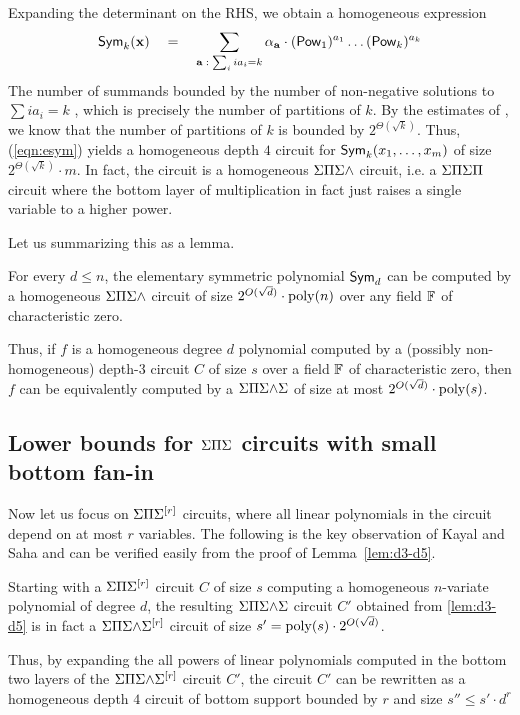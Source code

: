 Expanding the determinant on the RHS, we obtain a homogeneous
expression
\begin{equation}\label{eqn:esym}
\mathsf{Sym}_k(\mathbf{x}) \quad = \quad \sum_{\mathbf{a}\;:\; \sum_i ia_i = k} \alpha_{\mathbf{a}} \cdot (\mathsf{Pow}_1)^{a_1}\dots (\mathsf{Pow}_k)^{a_k}
\end{equation}
The number of summands bounded by the number of non-negative solutions
to $\sum i a_i = k$ , which is precisely the number of partitions of
$k$.
By the estimates of \cite{hr18}, we know that the number of partitions
of $k$ is bounded by $2^{\Theta(\sqrt{k})}$.
Thus, (\ref{eqn:esym}) yields a homogeneous depth $4$ circuit for
$\mathsf{Sym}_k(x_1,\dots, x_m)$ of size $2^{\Theta(\sqrt{k})} \cdot m$.
In fact, the circuit is a homogeneous $\Sigma\Pi\Sigma\mathord{\wedge}$ circuit, i.e. a $\Sigma\Pi\Sigma\Pi$
circuit where the bottom layer of multiplication in fact just raises a
single variable to a higher power. 

Let us summarizing this as a lemma. 

\begin{lemma}[\cite{sw2001}]\label{lem:d3-d5} For every $d \leq n$, the elementary
  symmetric polynomial $\mathsf{Sym}_d$ can be computed by a homogeneous
  $\Sigma\Pi\Sigma\mathord{\wedge}$ circuit of size $2^{O(\sqrt{d})} \cdot \mathrm{poly}(n)$ over any
  field $\mathbb{F}$ of characteristic zero. 

  Thus, if $f$ is a homogeneous degree $d$ polynomial computed by a (possibly
  non-homogeneous) depth-$3$ circuit $C$ of size $s$ over a field $\mathbb{F}$ of
  characteristic zero, then $f$ can be equivalently computed by a
  $\Sigma\Pi\Sigma\mathord{\wedge}\Sigma$ of size at most $2^{O(\sqrt{d})} \cdot \mathrm{poly}(s)$.
\end{lemma}

\subsection{Lower bounds for $\Sigma\Pi\Sigma$ circuits with small bottom fan-in}

Now let us focus on $\Sigma\Pi\Sigma^{[r]}$ circuits, where all linear
polynomials in the circuit depend on at most $r$ variables.
The following is the key observation of Kayal and Saha
\cite{KayalSaha14} and can be verified easily from the proof of
Lemma~\autoref{lem:d3-d5}. 

\begin{observation}
  Starting with a $\Sigma\Pi\Sigma^{[r]}$ circuit $C$ of size $s$ computing a
  homogeneous $n$-variate polynomial of degree $d$, the resulting
  $\Sigma\Pi\Sigma\mathord{\wedge}\Sigma$ circuit $C'$ obtained from
  \autoref{lem:d3-d5} is in fact a
  $\Sigma\Pi\Sigma\mathord{\wedge}\Sigma^{[r]}$ circuit of size $s' =
  \mathrm{poly}(s) \cdot 2^{O(\sqrt{d})}$. 

  Thus, by expanding the all powers of linear polynomials computed in
  the bottom two layers of the $\Sigma\Pi\Sigma\mathord{\wedge}\Sigma^{[r]}$ circuit
  $C'$, the circuit $C'$ can be rewritten as a homogeneous depth $4$
  circuit of bottom support bounded by $r$ and size $s'' \leq s' \cdot
  d^r$
\end{observation}

